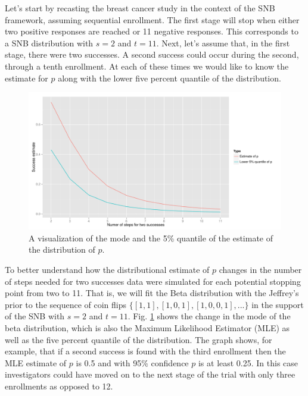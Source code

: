 \documentclass[12pt]{article}         %
\begin{document}
Let's start by recasting the breast cancer study in the context of the SNB 
framework, assuming sequential enrollment. The first stage will stop when 
either two positive responses are reached or 11 negative responses. This 
corresponds to a SNB distribution with $s=2$ and $t=11$. Next, let's assume 
that, in the first stage, there were two successes. A second success could 
occur during the second, through a tenth enrollment. At each of these times we 
would like to know the estimate for $p$ along with the lower five percent 
quantile of the distribution. 

\begin{figure}[ht]
\includegraphics[width=\textwidth]{uncertainty.pdf}
\caption{
A visualization of the mode and the 5\% quantile of the estimate of the distribution of $p$.
}
\label{fig:simon}
\end{figure}

To better understand how the distributional estimate of $p$ changes in the 
number of steps needed for two successes data were simulated for each 
potential stopping point from two to 11. That is, we will fit the
Beta distribution with the Jeffrey's prior to the sequence of coin flips 
$\{[1,1], [1, 0, 1], [1, 0, 0, 1], ... \}$ in the support of the SNB with
$s=2$ and $t=11$.  Fig. \ref{fig:simon} shows the 
change in the mode of the beta distribution, which is also the Maximum 
Likelihood Estimator (MLE) as well as the five percent quantile of the 
distribution.  The graph shows, for example, that if a second success is 
found with the third enrollment then the MLE estimate of $p$ is 0.5 and with 
95\% confidence $p$ is at least 0.25. In this case investigators could have 
moved on to the next stage of the trial with only three enrollments as 
opposed to 12.
\end{document}
